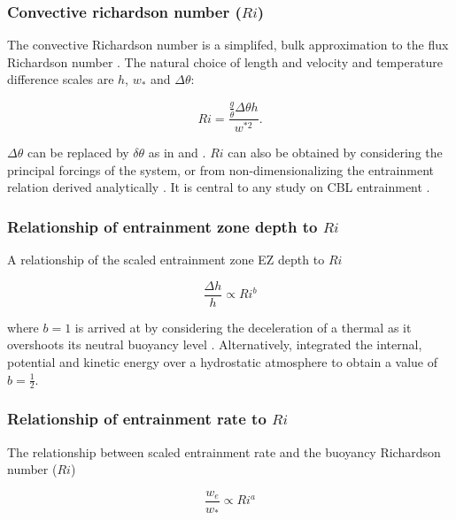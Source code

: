 \subsubsection{Convective richardson number ($Ri$)}
\label{subsubsec:}


The convective Richardson number is a simplifed, bulk approximation to the flux Richardson number \citep{Stull-BLMetIntro}.  The natural choice of length and velocity and temperature difference scales are $h$, $w_{*}$ and $\Delta \theta$:

\begin{equation}
Ri = \frac{\frac{g}{\overline{\theta}} \Delta \theta h}{w^{*2}}.
\end{equation}

$\Delta \theta$ can be replaced by $\delta \theta$ as in \cite{FedConzMir04} and \cite{GarciaMellado}.  $Ri$ can also be obtained by considering the principal forcings of the system, or from non-dimensionalizing the entrainment relation derived analytically \citep{Tennekes73, Deardorff72}. It is central to any study on CBL entrainment \citep{SullMoengStev, FedConzMir04, Traum11, BrooksFowler2}.

\subsubsection{Relationship of entrainment zone depth to $Ri$}

A relationship of the scaled entrainment zone EZ depth to $Ri$

\begin{equation}\label{eq:dhvsri}
\frac{\Delta h}{h} \propto Ri ^{b}
\end{equation}

where $b=1$ is arrived at by considering the deceleration of a thermal
as it overshoots its neutral buoyancy level \cite{StullNelEl}.  Alternatively, \cite{Boers89} integrated the internal, potential and kinetic energy over a hydrostatic atmosphere to obtain a value of $b=\frac{1}{2}$.

\subsubsection{Relationship of entrainment rate to $Ri$}
\label{subsec:erri}
The relationship between scaled entrainment rate and the buoyancy Richardson number ($Ri$)

\begin{equation}\label{eq:ervsri}
\frac{w_{e}}{w_{*}} \propto Ri^{a}
\end{equation}

